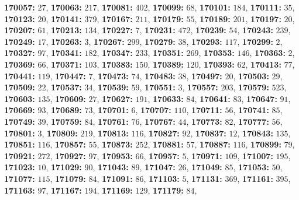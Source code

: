 \textsf{\bfseries 170057:} $27$, \textsf{\bfseries 170063:} $217$, \textsf{\bfseries 170081:} $402$, \textsf{\bfseries 170099:} $68$, \textsf{\bfseries 170101:} $184$, \textsf{\bfseries 170111:} $35$, \textsf{\bfseries 170123:} $20$, \textsf{\bfseries 170141:} $379$, \textsf{\bfseries 170167:} $211$, \textsf{\bfseries 170179:} $55$, \textsf{\bfseries 170189:} $201$, \textsf{\bfseries 170197:} $20$, \textsf{\bfseries 170207:} $61$, \textsf{\bfseries 170213:} $134$, \textsf{\bfseries 170227:} $7$, \textsf{\bfseries 170231:} $472$, \textsf{\bfseries 170239:} $54$, \textsf{\bfseries 170243:} $239$, \textsf{\bfseries 170249:} $17$, \textsf{\bfseries 170263:} $3$, \textsf{\bfseries 170267:} $299$, \textsf{\bfseries 170279:} $38$, \textsf{\bfseries 170293:} $117$, \textsf{\bfseries 170299:} $2$, \textsf{\bfseries 170327:} $97$, \textsf{\bfseries 170341:} $182$, \textsf{\bfseries 170347:} $233$, \textsf{\bfseries 170351:} $269$, \textsf{\bfseries 170353:} $146$, \textsf{\bfseries 170363:} $2$, \textsf{\bfseries 170369:} $66$, \textsf{\bfseries 170371:} $103$, \textsf{\bfseries 170383:} $150$, \textsf{\bfseries 170389:} $120$, \textsf{\bfseries 170393:} $62$, \textsf{\bfseries 170413:} $77$, \textsf{\bfseries 170441:} $119$, \textsf{\bfseries 170447:} $7$, \textsf{\bfseries 170473:} $74$, \textsf{\bfseries 170483:} $38$, \textsf{\bfseries 170497:} $20$, \textsf{\bfseries 170503:} $29$, \textsf{\bfseries 170509:} $22$, \textsf{\bfseries 170537:} $34$, \textsf{\bfseries 170539:} $59$, \textsf{\bfseries 170551:} $3$, \textsf{\bfseries 170557:} $203$, \textsf{\bfseries 170579:} $523$, \textsf{\bfseries 170603:} $135$, \textsf{\bfseries 170609:} $27$, \textsf{\bfseries 170627:} $191$, \textsf{\bfseries 170633:} $84$, \textsf{\bfseries 170641:} $83$, \textsf{\bfseries 170647:} $91$, \textsf{\bfseries 170669:} $93$, \textsf{\bfseries 170689:} $73$, \textsf{\bfseries 170701:} $6$, \textsf{\bfseries 170707:} $110$, \textsf{\bfseries 170711:} $56$, \textsf{\bfseries 170741:} $85$, \textsf{\bfseries 170749:} $39$, \textsf{\bfseries 170759:} $84$, \textsf{\bfseries 170761:} $76$, \textsf{\bfseries 170767:} $44$, \textsf{\bfseries 170773:} $82$, \textsf{\bfseries 170777:} $56$, \textsf{\bfseries 170801:} $3$, \textsf{\bfseries 170809:} $219$, \textsf{\bfseries 170813:} $116$, \textsf{\bfseries 170827:} $92$, \textsf{\bfseries 170837:} $12$, \textsf{\bfseries 170843:} $135$, \textsf{\bfseries 170851:} $116$, \textsf{\bfseries 170857:} $55$, \textsf{\bfseries 170873:} $252$, \textsf{\bfseries 170881:} $57$, \textsf{\bfseries 170887:} $116$, \textsf{\bfseries 170899:} $79$, \textsf{\bfseries 170921:} $272$, \textsf{\bfseries 170927:} $97$, \textsf{\bfseries 170953:} $66$, \textsf{\bfseries 170957:} $5$, \textsf{\bfseries 170971:} $109$, \textsf{\bfseries 171007:} $195$, \textsf{\bfseries 171023:} $10$, \textsf{\bfseries 171029:} $90$, \textsf{\bfseries 171043:} $89$, \textsf{\bfseries 171047:} $26$, \textsf{\bfseries 171049:} $85$, \textsf{\bfseries 171053:} $50$, \textsf{\bfseries 171077:} $115$, \textsf{\bfseries 171079:} $84$, \textsf{\bfseries 171091:} $86$, \textsf{\bfseries 171103:} $5$, \textsf{\bfseries 171131:} $369$, \textsf{\bfseries 171161:} $395$, \textsf{\bfseries 171163:} $97$, \textsf{\bfseries 171167:} $194$, \textsf{\bfseries 171169:} $129$, \textsf{\bfseries 171179:} $84$, 
